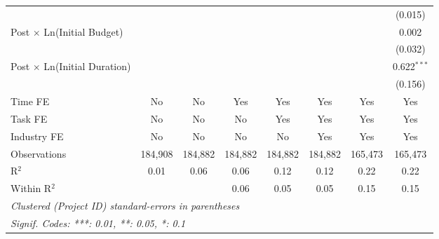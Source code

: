 \documentclass[
]{article}
\begin{document}
\begin{tabular}{lccccccc}
                                              &                &                &                &                &                &                & (0.015)\\   
   Post $\times$ Ln(Initial Budget)           &                &                &                &                &                &                & 0.002\\   
                                              &                &                &                &                &                &                & (0.032)\\   
   Post $\times$ Ln(Initial Duration)         &                &                &                &                &                &                & 0.622$^{***}$\\   
                                              &                &                &                &                &                &                & (0.156)\\   
   Time FE                                    & No             & No             & Yes            & Yes            & Yes            & Yes            & Yes\\  
   Task FE                                    & No             & No             & No             & Yes            & Yes            & Yes            & Yes\\  
   Industry FE                                & No             & No             & No             & No             & Yes            & Yes            & Yes\\  
   Observations                               & 184,908        & 184,882        & 184,882        & 184,882        & 184,882        & 165,473        & 165,473\\  
   R$^2$                                      & 0.01           & 0.06           & 0.06           & 0.12           & 0.12           & 0.22           & 0.22\\  
   Within R$^2$                               &                &                & 0.06           & 0.05           & 0.05           & 0.15           & 0.15\\  
   \midrule
   \multicolumn{8}{l}{\emph{Clustered (Project ID) standard-errors in parentheses}}\\
   \multicolumn{8}{l}{\emph{Signif. Codes: ***: 0.01, **: 0.05, *: 0.1}}\\
\end{tabular}
\par\endgroup
\end{document}
